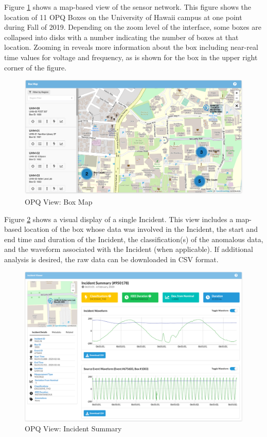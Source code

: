 Figure \ref{fig:opq-view-box-map} shows a map-based view of the sensor network. This figure shows the location of 11 OPQ Boxes on the University of Hawaii campus at one point during Fall of 2019. Depending on the zoom level of the interface, some boxes are collapsed into disks with a number indicating the number of boxes at that location. Zooming in reveals more information about the box including near-real time values for voltage and frequency, as is shown for the box in the upper right corner of the figure.

\begin{figure}
\center \includegraphics[width=5in]{images/view/boxmap-2.png}
\caption{OPQ View: Box Map}
\label{fig:opq-view-box-map}
\end{figure}

Figure \ref{fig:opq-view-incident-summary} shows a visual display of a single Incident. This view includes a map-based location of the box whose data was involved in the Incident, the start and end time and duration of the Incident, the classification(s) of the anomalous data, and the waveform associated with the Incident (when applicable). If additional analysis is desired, the raw data can be downloaded in CSV format.

\begin{figure}
\center \includegraphics[width=5in]{images/view/incident-summary.png}
\caption{OPQ View: Incident Summary}
\label{fig:opq-view-incident-summary}
\end{figure}

